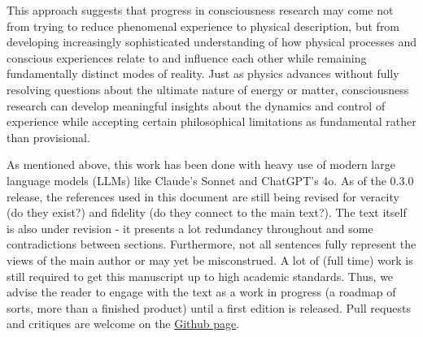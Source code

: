This approach suggests that progress in consciousness research may come not from trying to reduce phenomenal experience to physical description, but from developing increasingly sophisticated understanding of how physical processes and conscious experiences relate to and influence each other while remaining fundamentally distinct modes of reality. Just as physics advances without fully resolving questions about the ultimate nature of energy or matter, consciousness research can develop meaningful insights about the dynamics and control of experience while accepting certain philosophical limitations as fundamental rather than provisional.

As mentioned above, this work has been done with heavy use of modern large language models (LLMs) like Claude's Sonnet and ChatGPT's 4o. As of the 0.3.0 release, the references used in this document are still being revised for veracity (do they exist?) and fidelity (do they connect to the main text?). The text itself is also under revision - it presents a lot redundancy throughout and some contradictions between sections. Furthermore, not all sentences fully represent the views of the main author or may yet be misconstrued. A lot of (full time) work is still required to get this manuscript up to high academic standards. Thus, we advise the reader to engage with the text as a work in progress (a roadmap of sorts, more than a finished product) until a first edition is released. Pull requests and critiques are welcome on the \href{https://github.com/bobaseb/energetically-coherent-computation}{Github page}.
